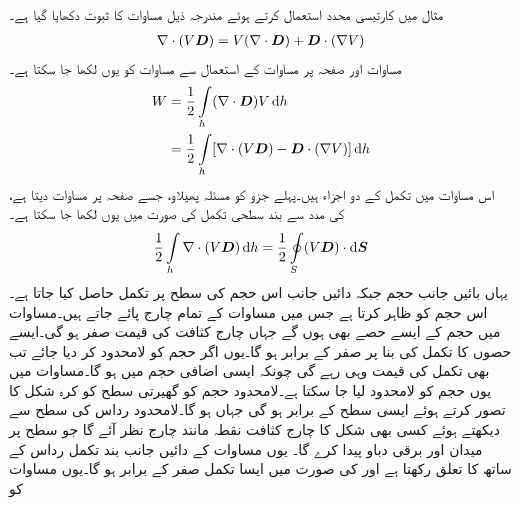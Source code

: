 مثال  میں کارتیسی محدد استعمال کرتے ہوئے مندرجہ ذیل مساوات کا ثبوت دکھایا گیا ہے۔
\begin{align}\label{مساوات_توانائی_توانائی_ضرب_برقی_بہاو_کی_ڈھلوان}
\nabla \cdot  (V {{\boldsymbol{D}}})=V (\nabla \cdot {\ensuremath{{\boldsymbol{D}}}})+{{\boldsymbol{D}}} \cdot (\nabla V)
\end{align}
مساوات  اور  صفحہ  پر مساوات  کے استعمال سے مساوات  کو یوں لکھا جا سکتا ہے۔
\begin{gather}
\begin{aligned}\label{مساوات_توانائی_کا_تکمل}
W&=\frac{1}{2}\int\limits_h (\nabla \cdot \kvec{D} )V \dif h\\
&=\frac{1}{2} \int \limits_h [\nabla \cdot (V \kvec{D})-\kvec{D} \cdot (\nabla V)] \dif h
\end{aligned}
\end{gather}
اس مساوات میں تکمل کے دو اجزاء ہیں۔پہلے جزو کو مسئلہ پھیلاو، جسے صفحہ  پر مساوات   دیتا ہے، کی مدد سے بند سطحی تکمل کی صورت میں یوں لکھا جا سکتا ہے۔
\begin{align}\label{مساوات_توانائی_لامحدود_سطح_بند_تکمل_صفر}
\frac{1}{2}\int\limits_h \nabla \cdot (V \kvec{D}) \dif h = \frac{1}{2}\oint \limits_S (V \kvec{D}) \cdot \dif \kvec{S}
\end{align} 
یہاں بائیں جانب حجم  جبکہ دائیں جانب اس حجم کی سطح  پر تکمل حاصل کیا جاتا ہے۔ اس حجم کو ظاہر کرتا ہے جس میں مساوات  کے تمام چارج پائے جاتے ہیں۔مساوات  میں حجم کے ایسے حصے بھی ہوں گے جہاں چارج کثافت  کی قیمت صفر ہو گی۔ایسے حصوں کا تکمل  کی بنا پر صفر کے برابر ہو گا۔یوں اگر حجم کو لامحدود کر دیا جائے تب بھی تکمل کی قیمت وہی رہے گی چونکہ ایسی اضافی حجم میں   ہو گا۔مساوات  میں یوں حجم کو لامحدود لیا جا سکتا ہے۔لامحدود حجم کو گھیرتی سطح کو کرہ شکل کا تصور کرتے ہوئے ایسی سطح  کے برابر ہو گی جہاں  ہو گا۔لامحدود رداس کی سطح سے دیکھتے ہوئے کسی بھی شکل کا چارج کثافت نقطہ مانند چارج  نظر آئے گا جو سطح پر  میدان اور  برقی دباو پیدا کرے گا۔ یوں مساوات   کے دائیں جانب بند تکمل رداس کے ساتھ  کا تعلق رکھتا ہے اور  کی صورت میں ایسا تکمل صفر کے برابر ہو گا۔یوں  مساوات  کو
